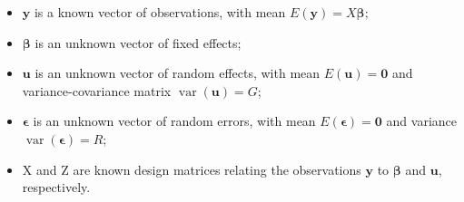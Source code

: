 \begin{itemize}
\item $\boldsymbol{y}$ is a known vector of observations, with mean $E(\boldsymbol{y}) = X \boldsymbol{\beta};$
\item $\boldsymbol{\beta}$ is an unknown vector of fixed effects;
\item $\boldsymbol{u}$ is an unknown vector of random effects, with mean $E(\boldsymbol{u})=\boldsymbol{0}$ and variance-covariance matrix $\operatorname{var}(\boldsymbol{u})=G$;
\item $\boldsymbol{\epsilon}$ is an unknown vector of random errors, with mean $E(\boldsymbol{\epsilon})=\boldsymbol{0}$ and variance $\operatorname{var}(\boldsymbol{\epsilon})=R$;
\item X and Z are known design matrices relating the observations $\boldsymbol{y}$ to $\boldsymbol{\beta}$ and $\boldsymbol{u}$, respectively.
\end{itemize}

